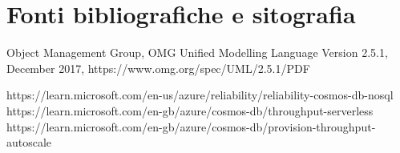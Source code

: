 \chapter*{Fonti bibliografiche e sitografia}

Object Management Group, OMG Unified Modelling Language Version 2.5.1, December 2017, https://www.omg.org/spec/UML/2.5.1/PDF

https://learn.microsoft.com/en-us/azure/reliability/reliability-cosmos-db-nosql
https://learn.microsoft.com/en-gb/azure/cosmos-db/throughput-serverless
https://learn.microsoft.com/en-gb/azure/cosmos-db/provision-throughput-autoscale